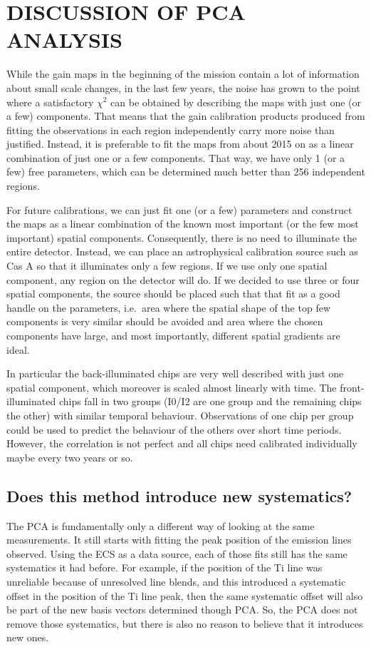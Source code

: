 \documentclass[]{spie}  %
\begin{document}
\section{DISCUSSION OF PCA ANALYSIS}
While the gain maps in the beginning of the mission contain a lot of information about small scale changes, in the last few years, the noise has grown to the point where a satisfactory $\chi^2$ can be obtained by describing the  maps with just one (or a few) components. That means that the gain calibration products produced from fitting the observations in each region independently carry more noise than justified. Instead, it is preferable to fit the maps from about 2015 on as a linear combination of just one or a few components. That way, we have only 1 (or a few) free parameters, which can be determined much better than 256 independent regions.

For future calibrations, we can just fit one (or a few) parameters and construct the maps as a linear combination of the known most important (or the few most important) spatial components. Consequently, there is no need to illuminate the entire detector. Instead, we can place an astrophysical calibration source such as Cas A so that it illuminates only a few regions. If we use only one spatial component, any region on the detector will do. If we decided to use three or four spatial components, the source should be placed such that that fit as a good handle on the parameters, i.e.\ area where the spatial shape of the top few components is very similar should be avoided and area where the chosen components have large, and most importantly, different spatial gradients are ideal.

In particular the back-illuminated chips are very well described with just one spatial component, which moreover is scaled almost linearly with time. The front-illuminated chips fall in two groups (I0/I2 are one group and the remaining chips the other) with similar temporal behaviour. Observations of one chip per group could be used to predict the behaviour of the others over short time periods. However, the correlation is not perfect and all chips need calibrated individually maybe every two years or so.

\subsection{Does this method introduce new systematics?}
The PCA is fundamentally only a different way of looking at the same measurements. It still starts with fitting the peak position of the emission lines observed. Using the ECS as a data source, each of those fits still has the same systematics it had before. For example, if the position of the Ti line was unreliable because of unresolved line blends, and this introduced a systematic offset in the position of the Ti line peak, then the same systematic offset will also be part of the new basis vectors determined though PCA. So, the PCA does not remove those systematics, but there is also no reason to believe that it introduces new ones.
\end{document}
